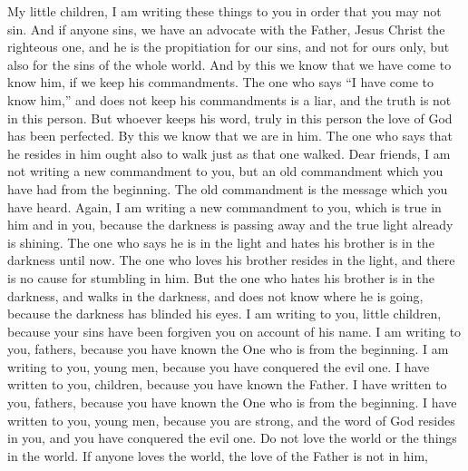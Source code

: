 \begin{biblechapter} %
 My little children, I am writing these things to you in order that you may not sin. And if anyone sins, we have an advocate with the Father, Jesus Christ the righteous one,
\verse and he is the propitiation for our sins, and not for ours only, but also for the sins of the whole world.
\verse And by this we know that we have come to know him, if we keep his commandments.
\verse The one who says “I have come to know him,” and does not keep his commandments is a liar, and the truth is not in this person.
\verse But whoever keeps his word, truly in this person the love of God has been perfected. By this we know that we are in him.
\verse The one who says that he resides in him ought also to walk just as that one walked.
\verse Dear friends, I am not writing a new commandment to you, but an old commandment which you have had from the beginning. The old commandment is the message which you have heard.
\verse Again, I am writing a new commandment to you, which is true in him and in you, because the darkness is passing away and the true light already is shining.
\verse The one who says he is in the light and hates his brother is in the darkness until now.
\verse The one who loves his brother resides in the light, and there is no cause for stumbling in him.
\verse But the one who hates his brother is in the darkness, and walks in the darkness, and does not know where he is going, because the darkness has blinded his eyes.
 I am writing to you, little children, because your sins have been forgiven you on account of his name.
\verse I am writing to you, fathers, because you have known the One who is from the beginning. I am writing to you, young men, because you have conquered the evil one.
\verse I have written to you, children, because you have known the Father. I have written to you, fathers, because you have known the One who is from the beginning. I have written to you, young men, because you are strong, and the word of God resides in you, and you have conquered the evil one.
 Do not love the world or the things in the world. If anyone loves the world, the love of the Father is not in him,

\end{biblechapter}
